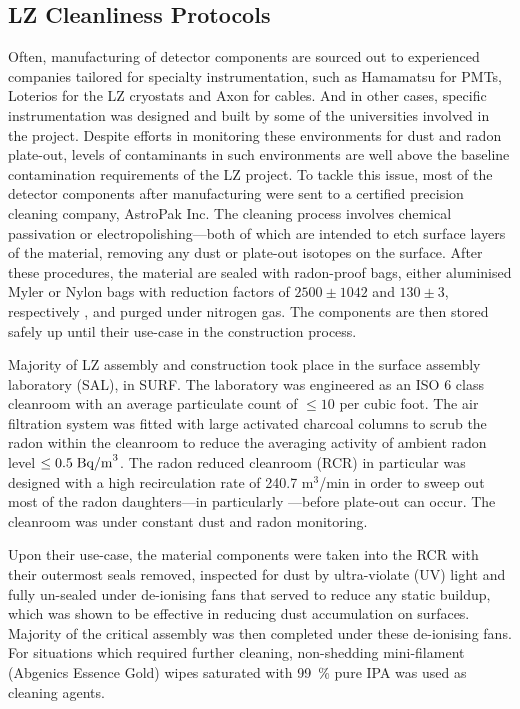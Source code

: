 \subsection{LZ Cleanliness Protocols}
\label{secsec:cleanliness}

Often, manufacturing of detector components are sourced out to  experienced companies tailored for specialty instrumentation, such as Hamamatsu for PMTs, Loterios for the LZ cryostats and Axon for cables. And in other cases, specific instrumentation was designed and built by some of the universities involved in the project. Despite efforts in monitoring these environments for dust and radon plate-out, levels of contaminants in such environments are well above the baseline contamination requirements of the LZ project. To tackle this issue, most of the detector components after manufacturing were sent to a certified precision cleaning company, AstroPak Inc. The cleaning process involves chemical passivation or electropolishing---both of which are intended to etch surface layers of the material, removing any dust or plate-out isotopes on the surface. After these procedures, the material are sealed with radon-proof bags, either aluminised Myler or Nylon bags with reduction factors of ${2500 \pm 1042}$ and ${130 \pm 3}$, respectively \cite{Meng:2019ker}, and purged under nitrogen gas. The components are then stored safely up until their use-case in the construction process. 

Majority of LZ assembly and construction took place in the surface assembly laboratory (SAL), in SURF. The laboratory was engineered as an ISO 6 class cleanroom with an average particulate count of $\leq 10$ per cubic foot. The air filtration system was fitted with large activated charcoal columns to scrub the radon within the cleanroom to reduce the averaging activity of ambient radon level  $\leq 0.5 \; \text{Bq/m}^{3}$. The radon reduced cleanroom (RCR) in particular was designed with a high recirculation rate of 240.7 m$^3$/min in order to sweep out most of the radon daughters---in particularly \PoTOE---before plate-out can occur. The cleanroom was under constant dust and radon monitoring. 

Upon their use-case, the material components were taken into the RCR with their outermost seals removed, inspected for dust by ultra-violate (UV) light and fully un-sealed under de-ionising fans that served to reduce any static buildup, which was shown to be effective in reducing dust accumulation on surfaces. Majority of the critical assembly was then completed under these de-ionising fans. For situations which required further cleaning, non-shedding mini-filament (Abgenics Essence Gold) wipes saturated with \SI{99}{\percent} pure IPA was used as cleaning agents. 

